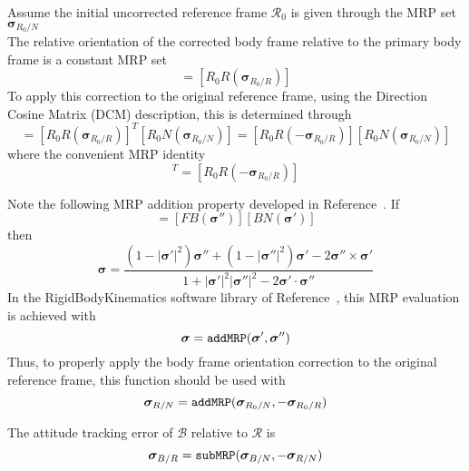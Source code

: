 Assume the initial uncorrected reference frame $\mathcal{R}_{0}$ is given through the MRP set $\bm\sigma_{R_{0}/N}$
\begin{equation}
	[R_{0}N(	\bm\sigma_{R_{0}/N})]
\end{equation}
The relative orientation of the corrected body frame relative to the primary body frame is a constant MRP set
\begin{equation}
	[B_{c}B(\bm\sigma_{B_{c}/B})] = [R_{0}R(\bm\sigma_{R_{0}/R})]
\end{equation}
To apply this correction to the original reference frame, using the Direction Cosine Matrix (DCM) description, this is determined through
\begin{equation}
	[RN(\bm\sigma_{R/N})] = [R_{0}R(\bm\sigma_{R_{0}/R})]^{T} [R_{0}N(\bm\sigma_{R_{0}/N})] = 
	[R_{0}R(-\bm\sigma_{R_{0}/R})] [R_{0}N(\bm\sigma_{R_{0}/N})]
\end{equation}
where the convenient MRP identity
\begin{equation}
	 [R_{0}R(\bm\sigma_{R_{0}/R})]^{T} = [R_{0}R(-\bm\sigma_{R_{0}/R})] 
\end{equation}

Note the following MRP addition property developed in Reference~.  If
\begin{equation}
	[BN(\bm\sigma)] = [FB(\bm\sigma '')] [ BN(\bm\sigma ')]
\end{equation}
then
\begin{equation}
	\bm\sigma = \frac{
		(1-|\bm\sigma'|^{2})\bm\sigma '' + (1-|\bm\sigma ''|^{2}) \bm\sigma ' - 2 \bm\sigma '' \times \bm\sigma '
	}{
		1 + |\bm\sigma '|^{2} |\bm\sigma''|^{2} - 2 \bm\sigma' \cdot \bm\sigma''
	}
\end{equation}
In the RigidBodyKinematics software library of Reference~, this MRP evaluation is achieved with 
$$
	\bm\sigma = {\tt addMRP}(\bm\sigma ', \bm\sigma'')
$$
Thus, to properly apply the body frame orientation correction to the original reference frame, this function should be used with
$$
	\bm\sigma_{R/N} = {\tt addMRP}(\bm\sigma_{R_{0}/N}, -\bm\sigma_{R_{0}/R})
$$

The attitude tracking error of $\mathcal{B}$ relative to $\mathcal{R}$ is
$$
	\bm\sigma_{B/R} = {\tt subMRP}(\bm\sigma_{B/N}, -\bm\sigma_{R/N})
$$





